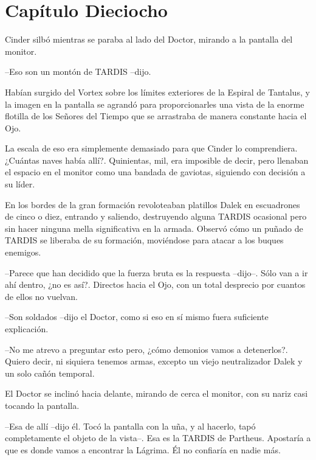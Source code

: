 \chapter*{Capítulo Dieciocho}




Cinder silbó mientras se paraba al lado del Doctor, mirando a la pantalla del monitor. 



--Eso son un montón de TARDIS --dijo.



Habían surgido del Vortex sobre los límites exteriores de la Espiral de Tantalus, y la imagen en la pantalla se agrandó para proporcionarles una vista de la enorme flotilla de los Señores del Tiempo que se arrastraba de manera constante hacia el Ojo.

La escala de eso era simplemente demasiado para que Cinder lo comprendiera. ¿Cuántas naves había allí?. Quinientas, mil, era imposible de decir, pero llenaban el espacio en el monitor como una bandada de gaviotas, siguiendo con decisión a su líder.

En los bordes de la gran formación revoloteaban platillos Dalek en escuadrones de cinco o diez, entrando y saliendo, destruyendo alguna TARDIS ocasional pero sin hacer ninguna mella significativa en la armada. Observó cómo un puñado de TARDIS se liberaba de su formación, moviéndose para atacar a los buques enemigos.



--Parece que han decidido que la fuerza bruta es la respuesta --dijo--. Sólo van a ir ahí dentro, ¿no es así?. Directos hacia el Ojo, con un total desprecio por cuantos de ellos no vuelvan.

--Son soldados --dijo el Doctor, como si eso en sí mismo fuera suficiente explicación.

--No me atrevo a preguntar esto pero, ¿cómo demonios vamos a detenerlos?. Quiero decir, ni siquiera tenemos armas, excepto un viejo neutralizador Dalek y un solo cañón temporal.



El Doctor se inclinó hacia delante, mirando de cerca el monitor, con su nariz casi tocando la pantalla. 



--Esa de allí --dijo él. Tocó la pantalla con la uña, y al hacerlo, tapó completamente el objeto de la vista--. Esa es la TARDIS de Partheus. Apostaría a que es donde vamos a encontrar la Lágrima. Él no confiaría en nadie más.



